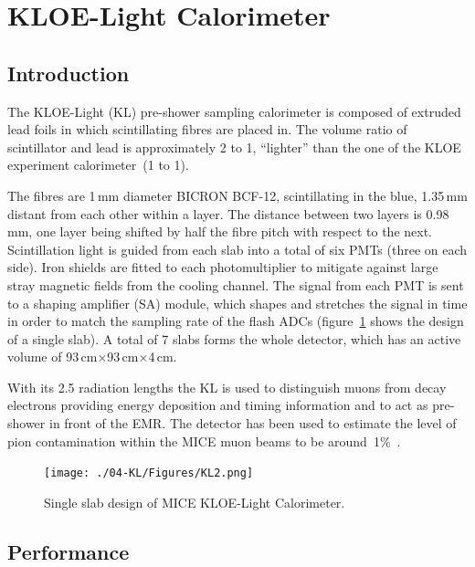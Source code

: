 \graphicspath{{04-KL/Figures/}}

\section{KLOE-Light Calorimeter}
\label{Sect:KL}

\subsection{Introduction}
\label{SubSect:KL_Intro}

The KLOE-Light (KL) pre-shower sampling calorimeter is composed of extruded lead foils in which scintillating fibres are placed in. The volume ratio of scintillator and lead is approximately 2 to 1, ``lighter'' than the one of the KLOE experiment calorimeter~(1 to 1).

The fibres are 1\,mm diameter BICRON BCF-12, scintillating in the blue, 1.35\,mm distant from each other within a layer. The distance between two layers is 0.98\,mm, one layer being shifted by half the fibre pitch with respect to the next.
Scintillation light is guided from each slab into a total of six PMTs (three on each side). Iron shields are fitted to each photomultiplier to
mitigate against large stray magnetic fields from the cooling channel. The signal from each PMT is sent to a shaping amplifier (SA) module, which shapes and stretches the signal in time in order to match the sampling rate of the flash ADCs (figure~\ref{fig:KL2} shows the design of a single slab).
A total of 7 slabs forms the whole detector, which has an active volume of 93\,cm$\times$93\,cm$\times$4\,cm.

With its 2.5 radiation lengths the KL is used to distinguish muons from decay electrons providing energy deposition and timing information and to act as pre-shower in front of the EMR.
The detector has been used to estimate the level of pion contamination within the MICE muon beams to be around~1\%~\cite{2016JInst..11P3001A}.
\begin{figure}
  \begin{center}
    \texttt{[image: ./04-KL/Figures/KL2.png]}
    \caption{Single slab design of MICE KLOE-Light Calorimeter.}
    \label{fig:KL2}
  \end{center}
\end{figure}



\subsection{Performance}
\label{SubSect:KL_Performance}

